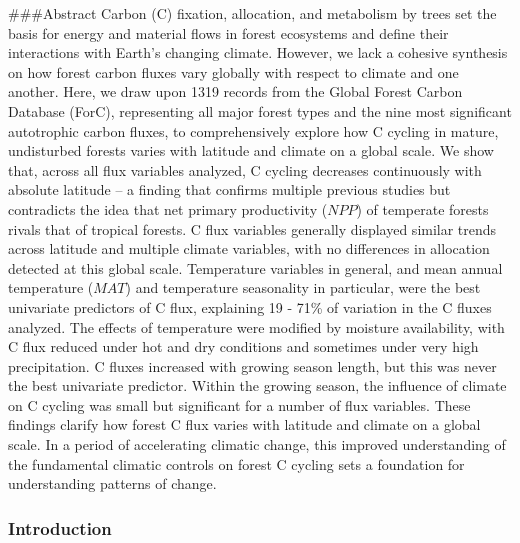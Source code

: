 \documentclass[
]{article}
\begin{document}
\#\#\#Abstract Carbon (C) fixation, allocation, and metabolism by trees
set the basis for energy and material flows in forest ecosystems and
define their interactions with Earth's changing climate. However, we
lack a cohesive synthesis on how forest carbon fluxes vary globally with
respect to climate and one another. Here, we draw upon 1319 records from
the Global Forest Carbon Database (ForC), representing all major forest
types and the nine most significant autotrophic carbon fluxes, to
comprehensively explore how C cycling in mature, undisturbed forests
varies with latitude and climate on a global scale. We show that, across
all flux variables analyzed, C cycling decreases continuously with
absolute latitude -- a finding that confirms multiple previous studies
but contradicts the idea that net primary productivity (\(NPP\)) of
temperate forests rivals that of tropical forests. C flux variables
generally displayed similar trends across latitude and multiple climate
variables, with no differences in allocation detected at this global
scale. Temperature variables in general, and mean annual temperature
(\(MAT\)) and temperature seasonality in particular, were the best
univariate predictors of C flux, explaining 19 - 71\% of variation in
the C fluxes analyzed. The effects of temperature were modified by
moisture availability, with C flux reduced under hot and dry conditions
and sometimes under very high precipitation. C fluxes increased with
growing season length, but this was never the best univariate predictor.
Within the growing season, the influence of climate on C cycling was
small but significant for a number of flux variables. These findings
clarify how forest C flux varies with latitude and climate on a global
scale. In a period of accelerating climatic change, this improved
understanding of the fundamental climatic controls on forest C cycling
sets a foundation for understanding patterns of change.

\newpage

\hypertarget{introduction}{%
\subsubsection{Introduction}\label{introduction}}
\end{document}
